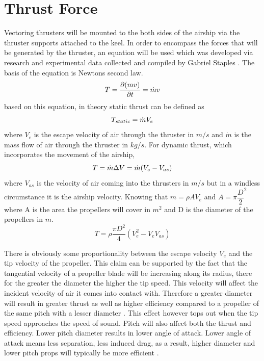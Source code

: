 \documentclass[../main.tex]{subfiles}
\begin{document}
\chapter{Thrust Force} \label{appendix:thrust}

Vectoring thrusters will be mounted to the both sides of the airship via the thruster supports attached to the keel. In order to encompass the forces that will be generated by the thruster, an equation will be used which was developed via research and experimental data collected and compiled by Gabriel Staples \cite{thrusteq}. The basis of the equation is Newtons second law.
	\begin{displaymath}
	T = {\dfrac{\partial (mv)}{\partial t}} = \dot{m}v\\
	\end{displaymath}
		based on this equation, in theory static thrust can be defined as
	\begin{displaymath}
		T_{static}  = \dot{m}V_{e}\\
	\end{displaymath}
	where $V_{e}$ is the escape velocity of air through the thruster in $m/s$ and $\dot{m}$ is the mass flow of air through the thruster in $kg/s$. For dynamic thrust, which incorporates the movement of the airship,
	\begin{displaymath}
	T  = \dot{m}\Delta V = \dot{m}(V_{e}-V_{as})\\
	\end{displaymath}
	where $V_{as}$ is the velocity of air coming into the thrusters in $m/s$ but in a windless circumstance it is the airship velocity. Knowing that $\dot{m} = \rho A V_{e}$ and $A = \pi {\dfrac{D}{2}}^2$ where A is the area the propellers will cover in $m^2$ and D is the diameter of the propellers in $m$.
	\begin{equation}
    \label{eqn:thrusttheoretical}
	T = \rho \dfrac{\pi D^2}{4} (V_{e}^2 - V_{e} V_{as})
	\end{equation}
    
There is obviously some proportionality between the escape velocity $V_{e}$ and the tip velocity of the propeller. This claim can be supported by the fact that the tangential velocity of a propeller blade will be increasing along its radius, there for the greater the diameter the higher the tip speed. This velocity will affect the incident velocity of air it comes into contact with. Therefore a greater diameter will result in greater thrust as well as higher efficiency compared to a propeller of the same pitch with a lesser diameter \cite{thrusteq}. This effect however tops out when the tip speed approaches the speed of sound. Pitch will also affect both the thrust and efficiency. Lower pitch diameter results in  lower angle of attack. Lower angle of attack means less separation, less induced drag, as a result, higher diameter and lower pitch props will typically be more efficient \cite{thrusteq}.\\
	
\end{document}
